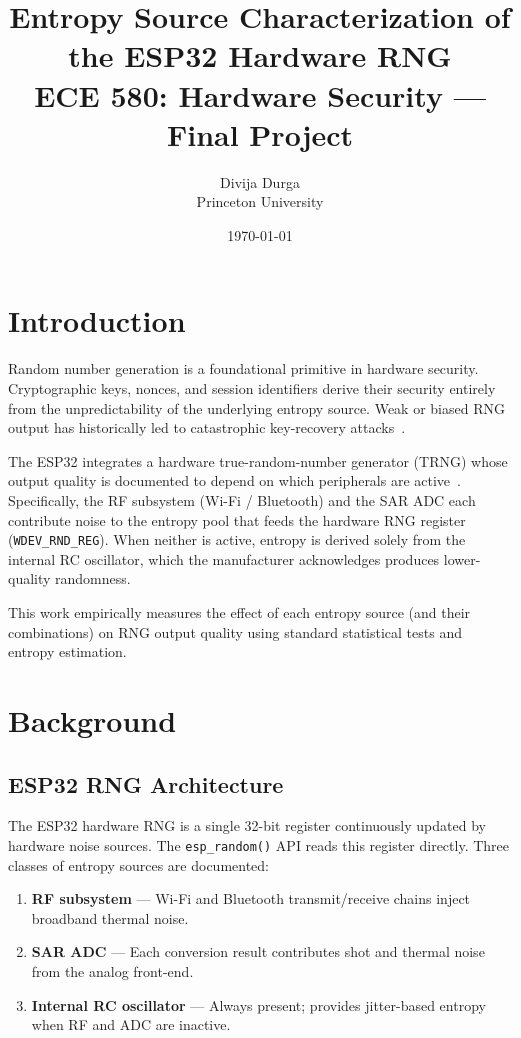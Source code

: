 \documentclass[10pt,twocolumn]{article}
\title{\textbf{Entropy Source Characterization of the ESP32 Hardware RNG}\\
       \large ECE 580: Hardware Security --- Final Project}
\author{Divija Durga\\Princeton University}
\date{\today}
\begin{document}
\maketitle

\section{Introduction}

Random number generation is a foundational primitive in hardware security.
Cryptographic keys, nonces, and session identifiers derive their security
entirely from the unpredictability of the underlying entropy source.
Weak or biased RNG output has historically led to catastrophic key-recovery
attacks~\cite{debian2008,androidecdsa}.

The ESP32 integrates a hardware true-random-number generator (TRNG) whose
output quality is documented to depend on which peripherals are
active~\cite{esp32trm}.
Specifically, the RF subsystem (Wi-Fi / Bluetooth) and the SAR ADC each
contribute noise to the entropy pool that feeds the hardware RNG register
(\texttt{WDEV\_RND\_REG}).
When neither is active, entropy is derived solely from the internal RC
oscillator, which the manufacturer acknowledges produces lower-quality
randomness.

This work empirically measures the effect of each entropy source
(and their combinations) on RNG output quality using standard statistical
tests and entropy estimation.

\section{Background}

\subsection{ESP32 RNG Architecture}

The ESP32 hardware RNG is a single 32-bit register continuously updated
by hardware noise sources.
The \texttt{esp\_random()} API reads this register directly.
Three classes of entropy sources are documented:

\begin{enumerate}
  \item \textbf{RF subsystem} --- Wi-Fi and Bluetooth transmit/receive
        chains inject broadband thermal noise.
  \item \textbf{SAR ADC} --- Each conversion result contributes shot and
        thermal noise from the analog front-end.
  \item \textbf{Internal RC oscillator} --- Always present; provides
        jitter-based entropy when RF and ADC are inactive.
\end{enumerate}
\end{document}

